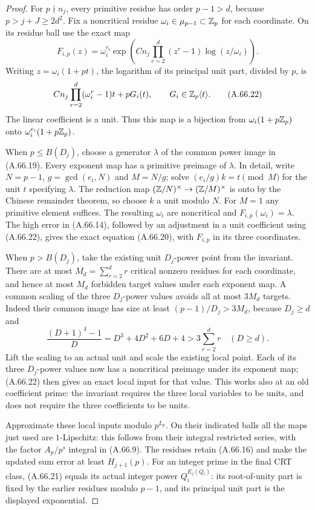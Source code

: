 \begin{proof}
For $p\nmid n_j$, every primitive residue has order
$p-1>d$, because $p>j+J\ge2d^2$.
Fix a noncritical residue $\omega_i\in\mu_{p-1}\subset\mathbb Z_p$
for each coordinate.  On its residue ball use the exact map
\[
 F_{i,p}(z)=\omega_i^{e_i}
       \exp\left(Cn_j\prod_{r=2}^d(z^r-1)
                                      \log(z/\omega_i)\right).
 \tag{A.66.21}
\]
Writing $z=\omega_i(1+pt)$, the logarithm of its principal
unit part, divided by $p$, is
\[
 Cn_j\prod_{r=2}^d(\omega_i^r-1)t+pG_i(t),
                     \qquad G_i\in\mathbb Z_p\langle t\rangle.
 \tag{A.66.22}
\]
The linear coefficient is a unit.  Thus this map is a
bijection from $\omega_i(1+p\mathbb Z_p)$ onto
$\omega_i^{e_i}(1+p\mathbb Z_p)$.

When $p\le B(D_j)$, choose a generator $\lambda$ of the
common power image in (A.66.19).  Every exponent map has
a primitive preimage of $\lambda$.  In detail, write
$N=p-1$, $g=\gcd(e_i,N)$ and $M=N/g$; solve
$(e_i/g)k=t\pmod M$ for the unit $t$ specifying
$\lambda$.  The reduction map
$(\mathbb Z/N)^\times\to(\mathbb Z/M)^\times$ is onto by the Chinese
remainder theorem, so choose $k$ a unit modulo $N$.
For $M=1$ any primitive element suffices.
The resulting $\omega_i$ are noncritical and
$F_{i,p}(\omega_i)=\lambda$.  The high error in
(A.66.14), followed by an adjustment in a unit coefficient
using (A.66.22), gives the exact equation (A.66.20), with
$F_{i,p}$ in its three coordinates.

When $p>B(D_j)$, take the existing unit $D_j$-power point
from the invariant.  There are at most
$M_d=\sum_{r=2}^d r$ critical nonzero residues for each
coordinate, and hence at most $M_d$ forbidden target
values under each exponent map.  A common scaling of
the three $D_j$-power values avoids all at most $3M_d$
targets.  Indeed their common image has size at least
$(p-1)/D_j>3M_d$, because $D_j\ge d$ and
\[
 \frac{(D+1)^4-1}{D}=D^3+4D^2+6D+4
                         >3\sum_{r=2}^d r\quad(D\ge d).
 \tag{A.66.23}
\]
Lift the scaling to an actual unit and scale the existing
local point.  Each of its three $D_j$-power values now has
a noncritical preimage under its exponent map; (A.66.22)
then gives an exact local input for that value.
This works also at an old coefficient prime: the invariant
requires the three local variables to be units, and does
not require the three coefficients to be units.

Approximate these local inputs modulo $p^{L_p}$.
On their indicated balls all the maps just used are
$1$-Lipschitz: this follows from their integral restricted
series, with the factor $A_p/p^s$ integral in (A.66.9).
The residues retain (A.66.16) and make the updated sum
error at least $H_{j+1}(p)$.  For an integer prime in
the final CRT class, (A.66.21) equals its actual integer
power $Q_i^{E_j(Q_i)}$: its root-of-unity part is fixed
by the earlier residues modulo $p-1$, and its principal
unit part is the displayed exponential.


\end{proof}
